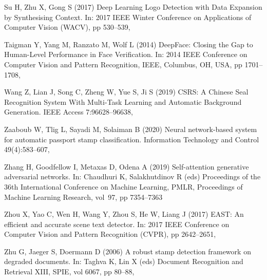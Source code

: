 \documentclass[twocolumn]{svjour3}
\begin{document}
\begin{thebibliography}{43}
	Su H, Zhu X, Gong S (2017) Deep {Learning} {Logo} {Detection} with {Data}
	{Expansion} by {Synthesising} {Context}. In: 2017 {IEEE} {Winter}
	{Conference} on {Applications} of {Computer} {Vision} ({WACV}), pp 530--539,
	
	Taigman Y, Yang M, Ranzato M, Wolf L (2014) {DeepFace}: {Closing} the {Gap} to
	{Human}-{Level} {Performance} in {Face} {Verification}. In: 2014 {IEEE}
	{Conference} on {Computer} {Vision} and {Pattern} {Recognition}, IEEE,
	Columbus, OH, USA, pp 1701--1708, 
	
	Wang Z, Lian J, Song C, Zheng W, Yue S, Ji S (2019) {CSRS}: {A} {Chinese}
	{Seal} {Recognition} {System} {With} {Multi}-{Task} {Learning} and
	{Automatic} {Background} {Generation}. IEEE Access 7:96628--96638,
	
	Zaaboub W, Tlig L, Sayadi M, Solaiman B (2020) Neural network-based system for
	automatic passport stamp classification. Information Technology and Control
	49(4):583--607, 
	
	Zhang H, Goodfellow I, Metaxas D, Odena A (2019) Self-attention generative
	adversarial networks. In: Chaudhuri K, Salakhutdinov R (eds) Proceedings of
	the 36th International Conference on Machine Learning, PMLR, Proceedings of
	Machine Learning Research, vol~97, pp 7354--7363
	
	Zhou X, Yao C, Wen H, Wang Y, Zhou S, He W, Liang J (2017) {EAST}: An efficient
	and accurate scene text detector. In: 2017 IEEE Conference on Computer Vision
	and Pattern Recognition (CVPR), pp 2642--2651,
	
	Zhu G, Jaeger S, Doermann D (2006) A robust stamp detection framework on
	degraded documents. In: Taghva K, Lin X (eds) Document Recognition and
	Retrieval XIII, SPIE, vol 6067, pp 80--88,
	
\end{thebibliography}
\end{document}
